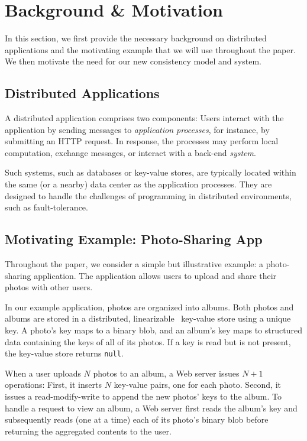 \section{Background \& Motivation}

In this section, we first provide the necessary background on 
distributed applications and the motivating example that we will
use throughout the paper. We then motivate the need for our
new consistency model and system.

\subsection{Distributed Applications}

A distributed application comprises two components: Users
interact with the application by sending messages to
\textit{application processes}, for instance, by submitting
an HTTP request. In response, the 
processes may perform local computation, exchange messages, or
interact with a back-end \textit{system}.

Such systems, such as databases or key-value stores, are typically
located within the same (or a nearby) data center as the application 
processes. They are designed to handle the challenges of
programming in distributed environments, such as fault-tolerance.

\subsection{Motivating Example: Photo-Sharing App}

Throughout the paper, we consider a simple but illustrative
example: a photo-sharing application. The application allows
users to upload and share their photos with other users.

In our example application, photos are organized into
albums. Both photos and albums are stored in a distributed,
linearizable~\cite{herlihy1990linearizability} key-value store
using a unique key. A photo's key maps to a binary blob, and
an album's key maps to structured data containing the keys of
all of its photos. If a key is read but is not present, the
key-value store returns \texttt{null}.

When a user uploads $N$ photos to an album, a Web server
issues $N+1$ operations: First, it inserts $N$ key-value
pairs, one for each photo. Second, it issues a read-modify-write
to append the new photos' keys to the album. To handle a request to
view an album, a Web server first reads the album's key and subsequently
reads (one at a time) each of its photo's binary blob before
returning the aggregated contents to the user.

